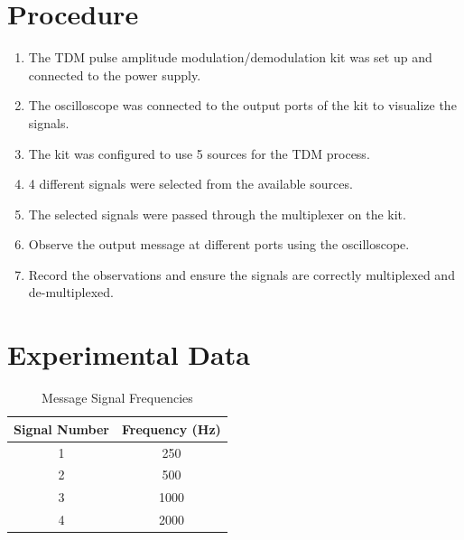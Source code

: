 \documentclass[12pt]{article}
\begin{document}
\section*{Procedure}
\begin{enumerate}
    \item The TDM pulse amplitude modulation/demodulation kit was set up and connected to the power supply.
    \item The oscilloscope was connected to the output ports of the kit to visualize the signals.
    \item The kit was configured to use 5 sources for the TDM process.
    \item 4 different signals were selected from the available sources.
    \item The selected signals were passed through the multiplexer on the kit.
    \item Observe the output message at different ports using the oscilloscope.
    \item Record the observations and ensure the signals are correctly multiplexed and de-multiplexed.
\end{enumerate}


\section*{Experimental Data}
\begin{table}[H]
    \centering
    \begin{tabular}{|c|c|}
        \hline
        \textbf{Signal Number} & \textbf{Frequency (Hz)} \\
        \hline
        1                      & 250                     \\
        \hline
        2                      & 500                     \\
        \hline
        3                      & 1000                    \\
        \hline
        4                      & 2000                    \\
        \hline
    \end{tabular}
    \caption{Message Signal Frequencies}
    \label{tab:signal_frequencies}
\end{table}
\end{document}
